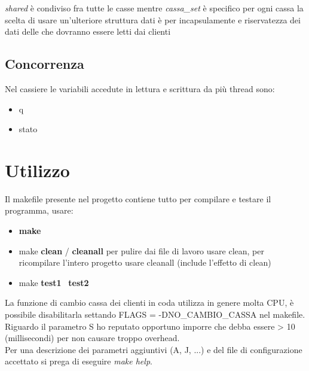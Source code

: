 \documentclass[11pt, a4paper]{article}
\begin{document}
\textit{shared} è condiviso fra tutte le casse mentre \textit{cassa\_set} è specifico per ogni cassa
la scelta di  usare un'ulteriore struttura dati è 
per  incapsulamente e riservatezza dei dati 
delle che dovranno essere letti dai clienti 
\subsection{Concorrenza}
Nel cassiere le variabili accedute in lettura e scrittura da più thread sono:
\begin{itemize}
\item q
\item stato
\end{itemize}

\section{Utilizzo}
Il makefile presente nel progetto contiene tutto per compilare e testare il programma, usare:
\begin{itemize}
\item \textbf{make}
\item make \textbf{clean} / \textbf{cleanall} per pulire dai file di lavoro usare clean, per ricompilare l'intero progetto usare cleanall (include l'effetto di clean)
\item make \textbf{test1} \ \textbf{test2}
\end{itemize}
La funzione di cambio cassa dei clienti in coda utilizza in genere molta CPU, è possibile disabilitarla settando FLAGS = -DNO\_CAMBIO\_CASSA nel makefile.\\
Riguardo il parametro S ho reputato opportuno imporre che debba essere > 10 (millisecondi) per non causare troppo overhead.\\
Per una descrizione dei parametri aggiuntivi (A, J, ...) e del file di configurazione accettato si prega di eseguire \textit{make help}.
\end{document}
